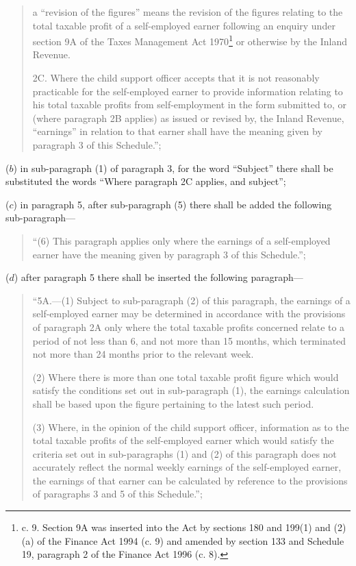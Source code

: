 \documentclass[12pt,a4paper]{article}
\begin{document}
\begin{enumerate}
\begin{quotation}
\begin{enumerate}
a “revision of the figures” means the revision of the figures relating to the total taxable profit of a self-employed earner following an enquiry under section 9A of the Taxes Management Act 1970\footnote{ c. 9. Section 9A was inserted into the Act by sections 180 and 199(1) and (2)(a) of the Finance Act 1994 (c. 9) and amended by section 133 and Schedule 19, paragraph 2 of the Finance Act 1996 (c. 8).} or otherwise by the Inland Revenue.
\end{enumerate}

\medskip

2C.  Where the child support officer accepts that it is not reasonably practicable for the self-employed earner to provide information relating to his total taxable profits from self-employment in the form submitted to, or (where paragraph 2B applies) as issued or revised by, the Inland Revenue, “earnings” in relation to that earner shall have the meaning given by paragraph 3 of this Schedule.”;
\end{quotation}

($b$) in sub-paragraph (1) of paragraph 3, for the word “Subject” there shall be substituted the words “Where paragraph 2C applies, and subject”;

($c$) in paragraph 5, after sub-paragraph (5) there shall be added the following sub-paragraph—
\begin{quotation}
“(6) This paragraph applies only where the earnings of a self-employed earner have the meaning given by paragraph 3 of this Schedule.”;
\end{quotation}

($d$) after paragraph 5 there shall be inserted the following paragraph—
\begin{quotation}
“5A.—(1) Subject to sub-paragraph (2) of this paragraph, the earnings of a self-employed earner may be determined in accordance with the provisions of paragraph 2A only where the total taxable profits concerned relate to a period of not less than 6, and not more than 15 months, which terminated not more than 24 months prior to the relevant week.

(2) Where there is more than one total taxable profit figure which would satisfy the conditions set out in sub-paragraph (1), the earnings calculation shall be based upon the figure pertaining to the latest such period.

(3) Where, in the opinion of the child support officer, information as to the total taxable profits of the self-employed earner which would satisfy the criteria set out in sub-paragraphs (1) and (2) of this paragraph does not accurately reflect the normal weekly earnings of the self-employed earner, the earnings of that earner can be calculated by reference to the provisions of paragraphs 3 and 5 of this Schedule.”;
\end{quotation}


\end{enumerate}
\end{document}
